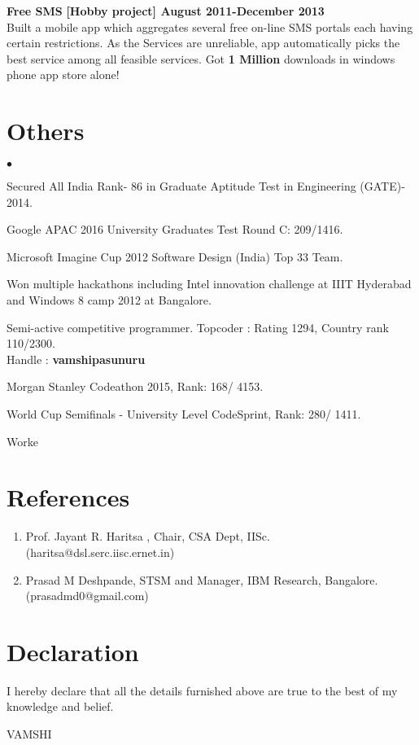\documentclass[margin,line]{res}
\newenvironment{list2}{
  \begin{list}{$\bullet$}{%
      \setlength{\itemsep}{0in}
      \setlength{\parsep}{0in} \setlength{\parskip}{0in}
      \setlength{\topsep}{0in} \setlength{\partopsep}{0in} 
      \setlength{\leftmargin}{0.2in}}}{\end{list}}
\begin{document}
\begin{resume}
{\bf Free SMS}
\hfill {\bf  [Hobby project] August 2011-December 2013}\\
Built a mobile app which aggregates several free on-line SMS portals each having certain restrictions. As the Services are unreliable, app automatically picks the best service among all feasible services. Got \textbf{1 Million} downloads in windows phone app store alone!

\section{\sc Others} 
\begin{list2}
\item Secured All India Rank- 86 in Graduate Aptitude Test in Engineering (GATE)- 2014.
\item Google APAC 2016  University Graduates Test Round C: 209/1416.
\item Microsoft Imagine Cup 2012 Software Design (India) Top 33 Team. 
\item Won multiple hackathons including Intel innovation challenge at IIIT Hyderabad and Windows 8 camp 2012 at Bangalore.
\item Semi-active competitive programmer. Topcoder : Rating 1294, Country rank 110/2300. \\Handle : \textbf{vamshipasunuru}
\item Morgan Stanley Codeathon 2015, Rank: 168/ 4153.
\item World Cup Semifinals - University Level CodeSprint, Rank:  280/ 1411.
\item Worke

\end{list2}
\section{\sc References}
\begin{enumerate}
\item Prof. Jayant R. Haritsa , Chair, CSA Dept, IISc. (haritsa@dsl.serc.iisc.ernet.in) 
\item Prasad M Deshpande, STSM and Manager, IBM Research,  Bangalore.(prasadmd0@gmail.com)
\end{enumerate}

\section{\sc Declaration}
I hereby declare that all the details furnished above are true to the best of my knowledge and belief. 
\begin{flushright}
VAMSHI
\end{flushright}

\end{resume}
\end{document}
